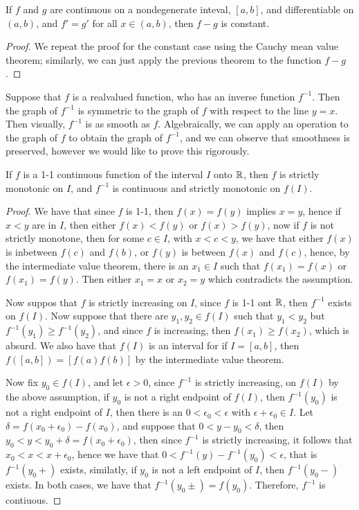 \begin{remark}
    If $f$ and  $g$ are continuous on a nondegenerate inteval,  $[a,b]$, and differentiable 
    on  $(a,b)$, and  $f'=g'$ for all  $x \in (a,b)$, then $f-g$ is constant.
\end{remark}
\begin{proof}
    We repeat the proof for the constant case using the Cauchy mean value theorem; 
    similarly, we can just apply the previous theorem to the function $f-g$.
\end{proof}

Suppose that $f$ is a realvalued function, who has an inverse function  $f^{-1}$. Then 
the graph of  $f^{-1}$ is symmetric to the graph of  $f$ with respect to the line  $y=x$. Then 
visually,  $f^{-1}$ is as smooth as  $f$. Algebraically, we can apply an operation to the graph 
of $f$ to obtain the graph of  $f^{-1}$, and we can observe that smoothness is preserved, however 
we would like to prove this rigorously.

\begin{theorem}\label{4.4.2}
    If $f$ is a  1-1 continuous function of the interval  $I$ onto $\mathbb{R}$, 
    then  $f$ is strictly monotonic on  $I$, and  $f^{-1}$ is continuous and strictly 
    monotonic on $f(I)$.
\end{theorem}
\begin{proof}
    We have that since $f$ is 1-1, then  $f(x)=f(y)$ implies  $x=y$, hence if  $x<y$ 
    are in $I$, then  either $f(x)<f(y)$ or  $f(x)>f(y)$, now if  $f$ is not strictly monotone, then 
    for some $c \in I$, with  $x<c<y$, we have that either  $f(x)$ is inbetween $f(c)$ and  $f(b)$, 
    or  $f(y)$ is between  $f(x)$ and  $f(c)$, hence, by the intermediate value theorem, there is an  $x_1 \in I$ 
    such that $f(x_1)=f(x)$ or $f(x_1)=f(y)$. Then either $x_1=x$ or $x_2=y$ which contradicts the assumption.

    Now suppos that $f$ is strictly increasing on  $I$, since  $f$ is 1-1 ont  $\mathbb{R}$, then 
    $f^{-1}$ exists on  $f(I)$. Now suppose that there are  $y_1,y_2 \in f(I)$ such that 
    $ y_1<y_2$ but $f^{-1}(y_1) \geq f^{-1}(y_2)$, and since $f$ is increasing, then  $f(x_1) \geq f(x_2)$, which 
    is absurd. We also have that $f(I)$ is an interval for if  $I=[a,b]$, then  $f([a,b])=[f(a)f(b)]$ by 
    the intermediate value theorem.

    Now fix  $y_0 \in f(I)$, and let $\epsilon>0$, since $f^{-1}$ is strictly increasing, on $f(I)$ by 
    the above assumption, if $y_0$ is not a right endpoint of $f(I)$, then  $f^{-1}(y_0)$ is not 
    a  right endpoint of  $I$, then  there is an $0<\epsilon_0<\epsilon$ with $\epsilon+\epsilon_0 \in I$. Let  $\delta=f(x_0+\epsilon_0)-f(x_0)$, 
    and suppose that $0<y-y_0<\delta$, then $y_0<y<y_0+\delta=f(x_0+\epsilon_0)$, then since $f^{-1}$ is strictly 
    increasing, it follows that  $x_0<x<x+\epsilon_0$, hence we have that $0<f^{-1}(y)-f^{-1}(y_0)<\epsilon$, 
    that is $f^{-1}(y_0+)$ exists, similatly, if $y_0$ is not a left endpoint of $I$, then  $f^{-1}(y_0-)$ 
    exists. In both cases, we have that $f^{-1}(y_0\pm)=f(y_0)$. Therefore, $f^{-1}$ is contiuous.
\end{proof}

